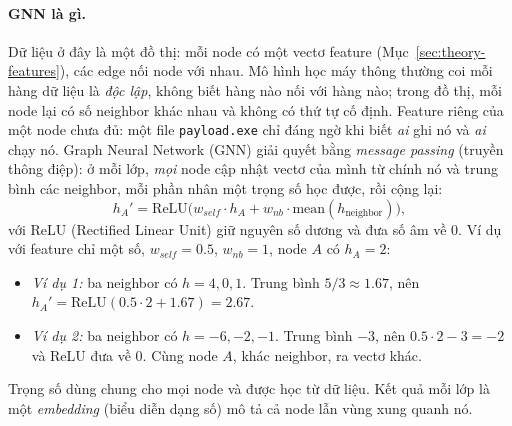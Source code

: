 \paragraph{GNN là gì.}
Dữ liệu ở đây là một đồ thị: mỗi node có một vectơ feature (Mục~\ref{sec:theory-features}), các edge nối node với nhau. Mô hình học máy thông thường coi mỗi hàng dữ liệu là \emph{độc lập}, không biết hàng nào nối với hàng nào; trong đồ thị, mỗi node lại có số neighbor khác nhau và không có thứ tự cố định. Feature riêng của một node chưa đủ: một file \texttt{payload.exe} chỉ đáng ngờ khi biết \emph{ai} ghi nó và \emph{ai} chạy nó. Graph Neural Network (GNN) giải quyết bằng \emph{message passing} (truyền thông điệp): ở mỗi lớp, \emph{mọi} node cập nhật vectơ của mình từ chính nó và trung bình các neighbor, mỗi phần nhân một trọng số học được, rồi cộng lại:
\[
h_A' = \mathrm{ReLU}\big(w_{self} \cdot h_A + w_{nb} \cdot \mathrm{mean}(h_{\text{neighbor}})\big),
\]
với ReLU (Rectified Linear Unit) giữ nguyên số dương và đưa số âm về 0. Ví dụ với feature chỉ một số, $w_{self} = 0.5$, $w_{nb} = 1$, node $A$ có $h_A = 2$:
\begin{itemize}
    \item \emph{Ví dụ 1:} ba neighbor có $h = 4, 0, 1$. Trung bình $5/3 \approx 1.67$, nên $h_A' = \mathrm{ReLU}(0.5 \cdot 2 + 1.67) = 2.67$.
    \item \emph{Ví dụ 2:} ba neighbor có $h = -6, -2, -1$. Trung bình $-3$, nên $0.5 \cdot 2 - 3 = -2$ và ReLU đưa về $0$. Cùng node $A$, khác neighbor, ra vectơ khác.
\end{itemize}
Trọng số dùng chung cho mọi node và được học từ dữ liệu. Kết quả mỗi lớp là một \emph{embedding} (biểu diễn dạng số) mô tả cả node lẫn vùng xung quanh nó.


